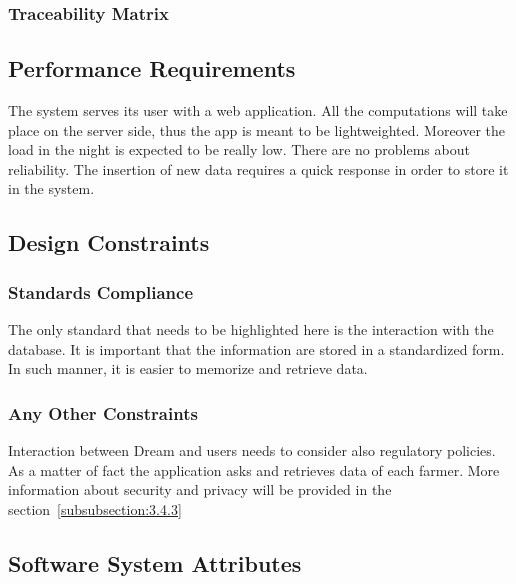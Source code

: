 \textbf{}
    \textbf{}
    \textbf{}
    \textbf{}
    \textbf{}
    \textbf{}
    \textbf{}
    \textbf{}
    \textbf{}
    \textbf{}
    \textbf{}
    \textbf{}



\subsubsection{Traceability Matrix}
\subsection{Performance Requirements}
The system serves its user with a web application. All the computations will take place on the server side, 
thus the app is meant to be lightweighted. Moreover the load in the night is expected to be really low.
There are no problems about reliability. The insertion of new data requires a quick response in order to store 
it in the system.

\subsection{Design Constraints}
\subsubsection{Standards Compliance}
The only standard that needs to be highlighted here is the interaction with the database. It is important that the information are stored 
in a standardized form. In such manner, it is easier to memorize and retrieve data.


\subsubsection{Any Other Constraints}
Interaction between Dream and users needs to consider also regulatory policies.
As a matter of fact the application asks and retrieves data of each farmer.
More information about security and privacy will be provided in the section~\ref{subsubsection:3.4.3}


\subsection{Software System Attributes}

